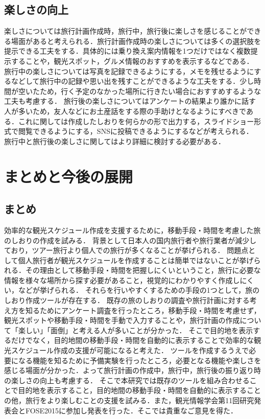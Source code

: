 \documentclass{funthesis}
\begin{document}
\section{楽しさの向上}
楽しさについては旅行計画作成時，旅行中，旅行後に楽しさを感じることができる場面があると考えられる．旅行計画作成時の楽しさについては多くの選択肢を提示できる工夫をする．具体的には乗り換え案内情報を1つだけではなく複数提示することや，観光スポット，グルメ情報のおすすめを表示するなどである．
旅行中の楽しさについては写真を記録できるようにする，メモを残せるようにするなどして旅行中の記録や思い出を残すことができるような工夫をする．少し時間が空いたため，行く予定のなかった場所に行きたい場合におすすめするような工夫も考慮する．
旅行後の楽しさについてはアンケートの結果より誰かに話す人が多いため，友人などにお土産話をする際の手助けとなるようにすべきである．これに関しては作成したしおりを何らかの形で出力する，スライドショー形式で閲覧できるようにする，SNSに投稿できるようにするなどが考えられる．
旅行中と旅行後の楽しさに関してはより詳細に検討する必要がある．


\chapter{まとめと今後の展開}%

\section{まとめ}

効率的な観光スケジュール作成を支援するために，移動手段・時間を考慮した旅のしおりの作成を試みる．
背景として日本人の国内旅行者や旅行業者が減少しており，ツアー旅行より個人での旅行が多くなることが挙げられる．
問題点として個人旅行者が観光スケジュールを作成することは簡単ではないことが挙げられる．その理由として移動手段・時間を把握しにくいということ，旅行に必要な情報を様々な場所から探す必要があること，視覚的にわかりやすく作成しにくい，などが挙げられる．
それらを行いやすくするための手段の1つとして，旅のしおり作成ツールが存在する．
既存の旅のしおりの調査や旅行計画に対する考え方を知るためにアンケート調査を行ったところ，移動手段・時間を考慮せず，観光スポットや移動手段・時間を手動で入力することや，旅行計画の作成について「楽しい」「面倒」と考える人が多いことが分かった．
そこで目的地を表示するだけでなく，目的地間の移動手段・時間を自動的に表示することで効率的な観光スケジュール作成の支援が可能になると考えた．
ツールを作成するうえで必要になる機能を知るために予備実験を行ったところ，必要となる機能や楽しさを感じる場面が分かった．よって旅行計画の作成中，旅行中，旅行後の振り返り時の楽しさの向上も考慮する．
そこで本研究では既存のツールを組み合わせることで目的地を表示すること，目的地間の移動手段・時間を自動的に表示することの他，旅行をより楽しむことの支援を試みる．また，観光情報学会第11回研究発表会とFOSE2015に参加し発表を行った．そこでは貴重なご意見を得た．
\end{document}
